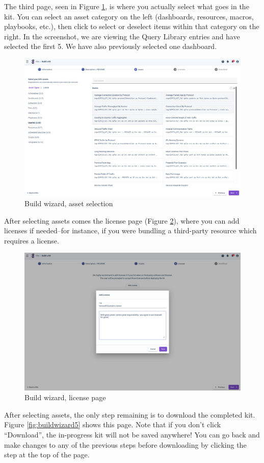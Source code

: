 The third page, seen in Figure \ref{fig:buildwizard3}, is where you actually select what goes in the kit. You can select an asset category on the left (dashboards, resources, macros, playbooks, etc.), then click to select or deselect items within that category on the right. In the screenshot, we are viewing the Query Library entries and have selected the first 5. We have also previously selected one dashboard.

\begin{figure}[H]
	\includegraphics[width=0.8\linewidth]{images/buildwizard3.png}
	\caption{Build wizard, asset selection}
	\label{fig:buildwizard3}
\end{figure}

After selecting assets comes the license page (Figure \ref{fig:buildwizard4}), where you can add licenses if needed--for instance, if you were bundling a third-party resource which requires a license.

\begin{figure}[H]
	\includegraphics[width=0.8\linewidth]{images/buildwizard4.png}
	\caption{Build wizard, license page}
	\label{fig:buildwizard4}
\end{figure}

After selecting assets, the only step remaining is to download the completed kit. Figure \ref{fig:buildwizard5} shows this page. Note that if you don't click ``Download'', the in-progress kit will not be saved anywhere! You can go back and make changes to any of the previous steps before downloading by clicking the step at the top of the page.

